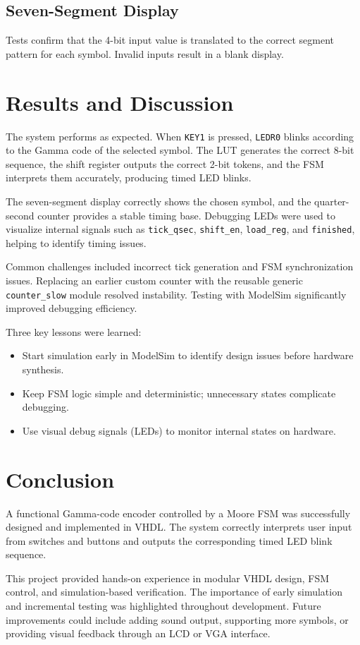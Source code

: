 \documentclass[conference]{IEEEtran}
\begin{document}
\subsection{Seven-Segment Display}
Tests confirm that the 4-bit input value is translated to the correct segment pattern for each symbol. Invalid inputs result in a blank display.

\section{Results and Discussion}
The system performs as expected. When \texttt{KEY1} is pressed, \texttt{LEDR0} blinks according to the Gamma code of the selected symbol. The LUT generates the correct 8-bit sequence, the shift register outputs the correct 2-bit tokens, and the FSM interprets them accurately, producing timed LED blinks.

The seven-segment display correctly shows the chosen symbol, and the quarter-second counter provides a stable timing base. Debugging LEDs were used to visualize internal signals such as \texttt{tick\_qsec}, \texttt{shift\_en}, \texttt{load\_reg}, and \texttt{finished}, helping to identify timing issues.

Common challenges included incorrect tick generation and FSM synchronization issues. Replacing an earlier custom counter with the reusable generic \texttt{counter\_slow} module resolved instability. Testing with ModelSim significantly improved debugging efficiency.

Three key lessons were learned:
\begin{itemize}
  \item Start simulation early in ModelSim to identify design issues before hardware synthesis.
  \item Keep FSM logic simple and deterministic; unnecessary states complicate debugging.
  \item Use visual debug signals (LEDs) to monitor internal states on hardware.
\end{itemize}

\section{Conclusion}
A functional Gamma-code encoder controlled by a Moore FSM was successfully designed and implemented in VHDL. The system correctly interprets user input from switches and buttons and outputs the corresponding timed LED blink sequence. 

This project provided hands-on experience in modular VHDL design, FSM control, and simulation-based verification. The importance of early simulation and incremental testing was highlighted throughout development. Future improvements could include adding sound output, supporting more symbols, or providing visual feedback through an LCD or VGA interface.

% 
% 
\end{document}
